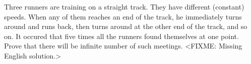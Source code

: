 \problem{}
Three runners are training on a straight track.
They have different (constant) speeds.
When any of them reaches an end of the track, he immediately turns around and
runs back, then turns around at the other end of the track, and so on.
It occured that five times all the runners found themselves at one point.
Prove that there will be infinite number of such meetings.
\solution
<FIXME: Missing English solution.>
\endproblem
